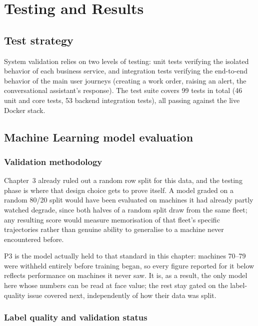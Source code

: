 \chapter{Testing and Results}

\section{Test strategy}

System validation relies on two levels of testing: unit tests verifying the isolated behavior of each business service, and integration tests verifying the end-to-end behavior of the main user journeys (creating a work order, raising an alert, the conversational assistant's response). The test suite covers 99 tests in total (46 unit and core tests, 53 backend integration tests), all passing against the live Docker stack.

\section{Machine Learning model evaluation}

\subsection{Validation methodology}

Chapter~3 already ruled out a random row split for this data, and the testing phase is where that design choice gets to prove itself. A model graded on a random 80/20 split would have been evaluated on machines it had already partly watched degrade, since both halves of a random split draw from the same fleet; any resulting score would measure memorisation of that fleet's specific trajectories rather than genuine ability to generalise to a machine never encountered before.

P3 is the model actually held to that standard in this chapter: machines 70--79 were withheld entirely before training began, so every figure reported for it below reflects performance on machines it never saw. It is, as a result, the only model here whose numbers can be read at face value; the rest stay gated on the label-quality issue covered next, independently of how their data was split.

\subsection{Label quality and validation status}
\label{sec:validation}

